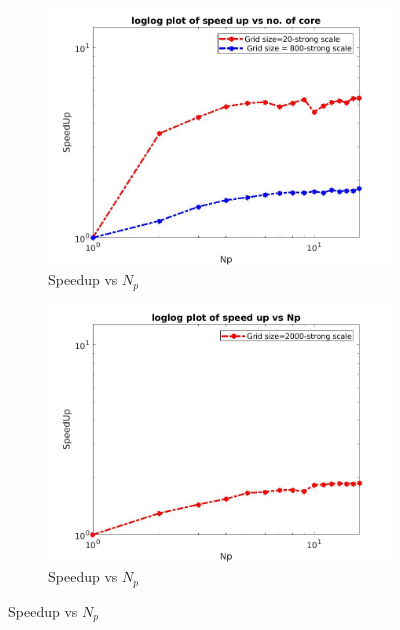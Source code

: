 \documentclass{article}
\begin{document}
\begin{figure}[t!]
\medskip
\begin{subfigure}{0.48\textwidth}
\includegraphics[width=\linewidth]{Speedupstrong.jpeg}
\caption{Speedup vs $N_p$ } \label{fig:c}
\end{subfigure}\hspace*{\fill}
\begin{subfigure}{0.48\textwidth}
\includegraphics[width=\linewidth]{Speedup2000.jpeg}
\caption{Speedup vs $N_p$ } \label{fig:d}
\end{subfigure}


\end{figure}
\end{document}
